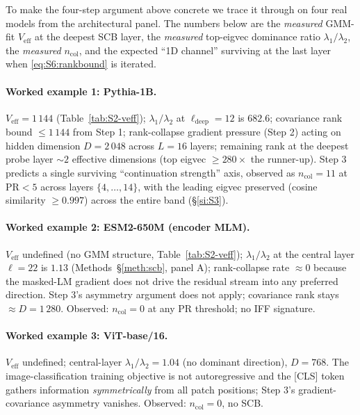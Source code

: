 \documentclass[11pt,a4paper]{article}
\begin{document}
To make the four-step argument above concrete we trace it through on
four real models from the architectural panel. The numbers below are
the \emph{measured} GMM-fit $V_\mathrm{eff}$ at the deepest SCB
layer, the \emph{measured} top-eigvec dominance ratio
$\lambda_1/\lambda_2$, the \emph{measured} $n_\mathrm{col}$, and the
expected ``1D channel'' surviving at the last layer when
\eqref{eq:S6:rankbound} is iterated.

\paragraph{Worked example 1: Pythia-1B.}
$V_\mathrm{eff}\!=\!1\,144$ (Table~\ref{tab:S2-veff});
$\lambda_1/\lambda_2$ at $\ell_\mathrm{deep}\!=\!12$ is
$682.6$; covariance rank bound $\leq\!1\,144$ from Step 1; rank-collapse
gradient pressure (Step 2) acting on hidden dimension $D\!=\!2\,048$
across $L\!=\!16$ layers; remaining rank at the deepest probe layer
$\sim\!2$ effective dimensions (top eigvec $\geq\!280\!\times\!$
the runner-up). Step 3 predicts a single surviving
``continuation strength'' axis, observed as $n_\mathrm{col}\!=\!11$
at PR$\!<\!5$ across layers $\{4,\ldots,14\}$, with the leading
eigvec preserved (cosine similarity $\geq\!0.997$) across the
entire band (\S\ref{si:S3}).

\paragraph{Worked example 2: ESM2-650M (encoder MLM).}
$V_\mathrm{eff}$ undefined (no GMM structure, Table~\ref{tab:S2-veff});
$\lambda_1/\lambda_2$ at the central layer $\ell\!=\!22$ is $1.13$
(Methods~\S\ref{meth:scb}, panel A);
rank-collapse rate $\approx\!0$ because the masked-LM gradient does not
drive the residual stream into any preferred direction. Step 3's
asymmetry argument does not apply; covariance rank stays
$\approx\!D\!=\!1\,280$. Observed: $n_\mathrm{col}\!=\!0$ at any PR
threshold; no IFF signature.

\paragraph{Worked example 3: ViT-base/16.}
$V_\mathrm{eff}$ undefined; central-layer $\lambda_1/\lambda_2\!=\!1.04$
(no dominant direction), $D\!=\!768$. The image-classification
training objective is not autoregressive and the [CLS] token gathers
information \emph{symmetrically} from all patch positions; Step 3's
gradient-covariance asymmetry vanishes. Observed:
$n_\mathrm{col}\!=\!0$, no SCB.
\end{document}
